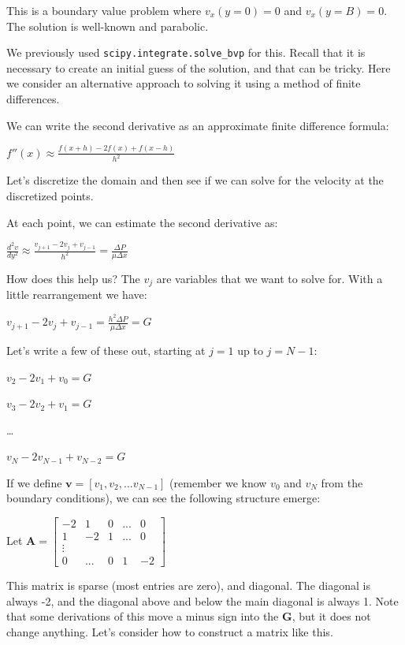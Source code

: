 \documentclass[11pt]{article}
\begin{document}
This is a boundary value problem where \(v_x(y=0) = 0\) and \(v_x(y=B) = 0\). The solution is well-known and parabolic.

We previously used \texttt{scipy.integrate.solve\_bvp} for this. Recall that it is necessary to create an initial guess of the solution, and that can be tricky. Here we consider an alternative approach to solving it using a method of finite differences.


We can write the second derivative as an approximate finite difference formula:

\(f''(x) \approx \frac{f(x + h) - 2 f(x) + f(x-h)}{h^2}\)

Let's discretize the domain and then see if we can solve for the velocity at the discretized points.

At each point, we can estimate the second derivative as:

\(\frac{d^2 v}{dy^2} \approx \frac{v_{j+1} - 2 v_j + v_{j-1}}{h^2} = \frac{\Delta P}{\mu\Delta x}\)

How does this help us? The \(v_j\) are variables that we want to solve for. With a little rearrangement we have:

\(v_{j+1} - 2 v_j + v_{j-1} = \frac{h^2 \Delta P}{\mu\Delta x} = G\)

Let's write a few of these out, starting at \(j=1\) up to \(j=N-1\):

\(v_2 - 2 v_1 + v_0 = G\)

\(v_3 - 2 v_2 + v_1 = G\)

\ldots{}

\(v_{N} - 2 v_{N-1} + v_{N-2} = G\)

If we define \(\mathbf{v} = [v_1, v_2, ... v_{N-1}]\) (remember we know \(v_0\) and \(v_{N}\) from the boundary conditions), we can see the following structure emerge:

Let \(\mathbf{A} = \left[\begin{array}{ccccc}
 -2 & 1 & 0 & ... & 0 \\
 1 & -2 & 1 & ...& 0\\
 \vdots\\
 0 & ... & 0 & 1 & -2
 \end{array}\right]\)

This matrix is sparse (most entries are zero), and diagonal. The diagonal is always -2, and the diagonal above and below the main diagonal is always 1. Note that some derivations of this move a minus sign into the \(\mathbf{G}\), but it does not change anything. Let's consider how to construct a matrix like this.
\end{document}
